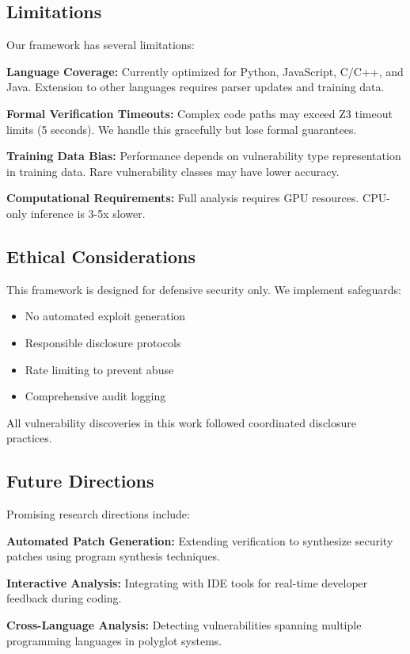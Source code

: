 \documentclass[10pt,journal,compsoc]{IEEEtran}
\begin{document}
\subsection{Limitations}
Our framework has several limitations:

\textbf{Language Coverage:} Currently optimized for Python, JavaScript, C/C++, and Java. Extension to other languages requires parser updates and training data.

\textbf{Formal Verification Timeouts:} Complex code paths may exceed Z3 timeout limits (5 seconds). We handle this gracefully but lose formal guarantees.

\textbf{Training Data Bias:} Performance depends on vulnerability type representation in training data. Rare vulnerability classes may have lower accuracy.

\textbf{Computational Requirements:} Full analysis requires GPU resources. CPU-only inference is 3-5x slower.

\subsection{Ethical Considerations}
This framework is designed for defensive security only. We implement safeguards:
\begin{itemize}
\item No automated exploit generation
\item Responsible disclosure protocols
\item Rate limiting to prevent abuse
\item Comprehensive audit logging
\end{itemize}

All vulnerability discoveries in this work followed coordinated disclosure practices.

\subsection{Future Directions}
Promising research directions include:

\textbf{Automated Patch Generation:} Extending verification to synthesize security patches using program synthesis techniques.

\textbf{Interactive Analysis:} Integrating with IDE tools for real-time developer feedback during coding.

\textbf{Cross-Language Analysis:} Detecting vulnerabilities spanning multiple programming languages in polyglot systems.
\end{document}
